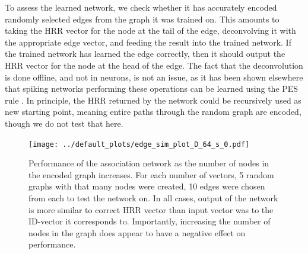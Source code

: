 \documentclass[10pt,letterpaper]{article}
\begin{document}
To assess the learned network, we check whether it has accurately encoded randomly selected edges from the graph it was trained on. This amounts to taking the HRR vector for the node at the tail of the edge, deconvolving it with the appropriate edge vector, and feeding the result into the trained network. If the trained network has learned the edge correctly, then it should output the HRR vector for the node at the head of the edge. The fact that the deconvolution is done offline, and not in neurons, is not an issue, as it has been shown elsewhere that spiking networks performing these operations can be learned using the PES rule \citep{Stewart2011a}. In principle, the HRR returned by the network could be recursively used as new starting point, meaning entire paths through the random graph are encoded, though we do not test that here.

\begin{figure}[htb]
\begin{center}
\texttt{[image: ../default\_plots/edge\_sim\_plot\_D\_64\_s\_0.pdf]}
\end{center}
\caption{Performance of the association network as the number of nodes in the encoded graph increases. For each number of vectors, 5 random graphs with that many nodes were created, 10 edges were chosen from each to test the network on. In all cases, output of the network is more similar to correct HRR vector than input vector was to the ID-vector it corresponds to. Importantly, increasing the number of nodes in the graph does appear to have a negative effect on performance. }
\label{fig:results}
\end{figure}
\end{document}
